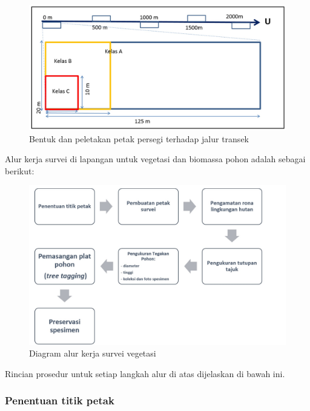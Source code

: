 \documentclass[
]{book}
\begin{document}
\begin{figure}

{\centering \includegraphics[width=1\linewidth]{images/pv_ilustration} 

}

\caption{Bentuk dan peletakan petak persegi terhadap jalur transek}\label{fig:figpv}
\end{figure}

Alur kerja survei di lapangan untuk vegetasi dan biomassa pohon adalah sebagai berikut:

\begin{figure}

{\centering \includegraphics[width=1\linewidth]{images/av_ilustration} 

}

\caption{Diagram alur kerja survei vegetasi}\label{fig:figav}
\end{figure}

Rincian prosedur untuk setiap langkah alur di atas dijelaskan di bawah ini.

\hypertarget{penentuan-titik-petak}{%
\subsubsection*{Penentuan titik petak}\label{penentuan-titik-petak}}
\end{document}
